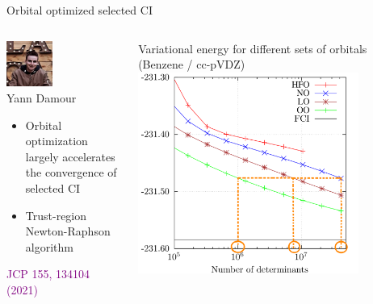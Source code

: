 \documentclass[aspectratio=169,9pt]{beamer}
\newcommand{\pub}[1]{{\small \textcolor{purple}{#1}}}
\begin{document}
\begin{frame}{Orbital optimized selected CI}

\begin{columns}

\begin{column}{0.5\textwidth}

\centering
\includegraphics[width=0.4\textwidth]{fig/Yann2.jpg}
\\
Yann Damour
\\

\begin{itemize}
	\item Orbital optimization largely accelerates the convergence of selected CI
                        \bigskip
	\item Trust-region Newton-Raphson algorithm
                        \bigskip
\end{itemize}
			\bigskip
                        \centering
			\pub{JCP 155, 134104 (2021)}
\end{column}

                \begin{column}{0.5\textwidth}
                        \centering
			\begin{block}{Variational energy for different sets of orbitals (Benzene / cc-pVDZ)}
                        \centering
                        \includegraphics[width=0.8\textwidth]{fig/benzene.png}
                        \end{block}
                \end{column}


\end{columns}
\end{frame}
\end{document}
